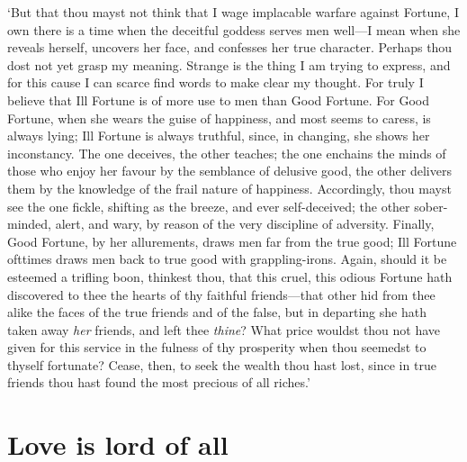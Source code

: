 \documentclass[11pt]{book}
\begin{document}
`But that thou mayst not think that I wage implacable warfare against
Fortune, I own there is a time when the deceitful goddess serves men
well---I mean when she reveals herself, uncovers her face, and confesses
her true character. Perhaps thou dost not yet grasp my meaning. Strange
is the thing I am trying to express, and for this cause I can scarce
find words to make clear my thought. For truly I believe that Ill
Fortune is of more use to men than Good Fortune. For Good Fortune, when
she wears the guise of happiness, and most seems to caress, is always
lying; Ill Fortune is always truthful, since, in changing, she shows her
inconstancy. The one deceives, the other teaches; the one enchains the
minds of those who enjoy her favour by the semblance of delusive good,
the other delivers them by the knowledge of the frail nature of
happiness. Accordingly, thou mayst see the one fickle, shifting as the
breeze, and ever self-deceived; the other sober-minded, alert, and wary,
by reason of the very discipline of adversity. Finally, Good Fortune, by
her allurements, draws men far from the true good; Ill Fortune ofttimes
draws men back to true good with grappling-irons. Again, should it be
esteemed a trifling boon, thinkest thou, that this cruel, this odious
Fortune hath discovered to thee the hearts of thy faithful friends---that
other hid from thee alike the faces of the true friends and of the
false, but in departing she hath taken away \emph{her} friends, and left thee
\emph{thine}? What price wouldst thou not have given for this service in the
fulness of thy prosperity when thou seemedst to thyself fortunate?
Cease, then, to seek the wealth thou hast lost, since in true friends
thou hast found the most precious of all riches.'




\section{Love is lord of all}
\end{document}
